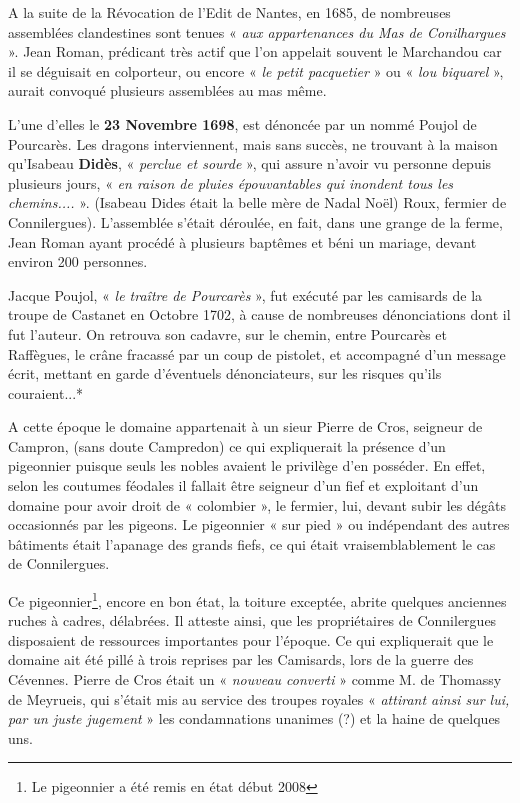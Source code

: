A la suite de la Révocation de l’Edit de Nantes, en 1685, de nombreuses assemblées
clandestines sont tenues « \textit{aux appartenances du Mas de Conilhargues} ». Jean Roman,
prédicant très actif que l’on appelait souvent le Marchandou car il se déguisait en colporteur,
ou encore « \textit{le petit pacquetier} » ou « \textit{lou biquarel} », aurait convoqué plusieurs assemblées
au mas même.

\vspace{0.2cm}

L’une d’elles le \textbf{23 Novembre 1698}, est dénoncée par un nommé Poujol de Pourcarès. Les
dragons interviennent, mais sans succès, ne trouvant à la maison qu’Isabeau \textbf{Didès}, « \textit{perclue
et sourde} », qui assure n’avoir vu personne depuis plusieurs jours, « \textit{en raison de pluies
épouvantables qui inondent tous les chemins....} ». (Isabeau Dides était la belle mère de Nadal
Noël) Roux, fermier de Connilergues).
L’assemblée s’était déroulée, en fait, dans une grange de la ferme, Jean Roman ayant procédé
à plusieurs baptêmes et béni un mariage, devant environ 200 personnes.

\vspace{0.2cm}

Jacque Poujol, « \textit{le traître de Pourcarès} », fut exécuté par les camisards de la troupe de
Castanet en Octobre 1702, à cause de nombreuses dénonciations dont il fut l’auteur. On
retrouva son cadavre, sur le chemin, entre Pourcarès et Raffègues, le crâne fracassé par un
coup de pistolet, et accompagné d’un message écrit, mettant en garde d’éventuels
dénonciateurs, sur les risques qu’ils couraient...*

A cette époque le domaine appartenait à un sieur Pierre de Cros, seigneur de Campron, (sans
doute Campredon) ce qui expliquerait la présence d’un pigeonnier puisque seuls les nobles
avaient le privilège d’en posséder. En effet, selon les coutumes féodales il fallait être seigneur
d’un fief et exploitant d’un domaine pour avoir droit de « colombier », le fermier, lui, devant
subir les dégâts occasionnés par les pigeons. Le pigeonnier « sur pied » ou indépendant des
autres bâtiments était l’apanage des grands fiefs, ce qui était vraisemblablement le cas de
Connilergues.

\vspace{0.2cm}

Ce pigeonnier\footnote{Le pigeonnier a été remis en état début 2008}, encore en bon état, la toiture exceptée, abrite quelques anciennes ruches à
cadres, délabrées. Il atteste ainsi, que les propriétaires de Connilergues disposaient de
ressources importantes pour l’époque. Ce qui expliquerait que le domaine ait été pillé à trois
reprises par les Camisards, lors de la guerre des Cévennes. Pierre de Cros était un « \textit{nouveau
converti} » comme M. de Thomassy de Meyrueis, qui s’était mis au service des troupes royales
« \textit{attirant ainsi sur lui, par un juste jugement} » les condamnations unanimes (?) et la haine de
quelques uns.

